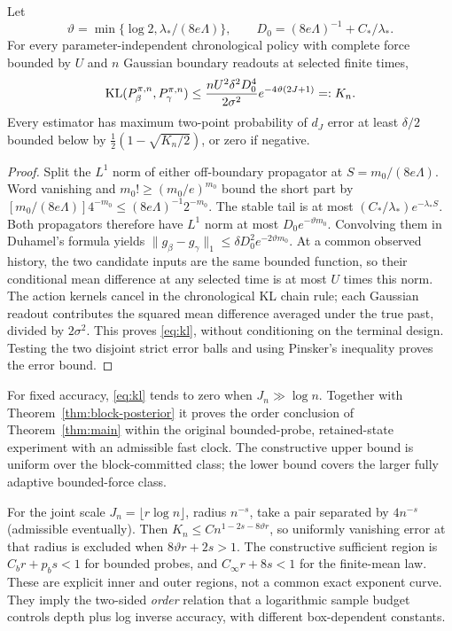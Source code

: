 \begin{theorem}
\label{thm:global}
Let
\[
 \vartheta=\min\{\log2,\lambda_* /(8e\Lambda)\},\qquad
 D_0=(8e\Lambda)^{-1}+C_*/\lambda_*.
\]
For every parameter-independent chronological policy with complete force
bounded by $U$ and $n$ Gaussian boundary readouts at selected finite times,
\begin{equation}
 \operatorname{KL}(P_\beta^{\pi,n},P_\gamma^{\pi,n})
 \le\frac{nU^2\delta^2D_0^4}{2\sigma^2}e^{-4\vartheta(2J+1)}=:K_n.
 \label{eq:kl}
\end{equation}
Every estimator has maximum two-point probability of $d_J$ error at least
$\delta/2$ bounded below by $\frac12(1-\sqrt{K_n/2})$, or zero if negative.
\end{theorem}
\begin{proof}
Split the $L^1$ norm of either off-boundary propagator at
$S=m_0/(8e\Lambda)$. Word vanishing and $m_0!\ge(m_0/e)^{m_0}$ bound the
short part by
$[m_0/(8e\Lambda)]4^{-m_0}\le(8e\Lambda)^{-1}2^{-m_0}$.
The stable tail is at most $(C_*/\lambda_*)e^{-\lambda_*S}$.
Both propagators therefore have $L^1$ norm at most $D_0e^{-\vartheta m_0}$.
Convolving them in Duhamel's formula yields
$\|g_\beta-g_\gamma\|_1\le\delta D_0^2e^{-2\vartheta m_0}$.
At a common observed history, the two candidate inputs are the same bounded
function, so their conditional mean difference at any selected time is at
most $U$ times this norm. The action kernels cancel in the chronological
KL chain rule; each Gaussian readout contributes the squared mean difference
averaged under the true past, divided by $2\sigma^2$.
This proves \eqref{eq:kl}, without conditioning on the terminal design.
Testing the two disjoint strict error balls and using Pinsker's inequality
proves the error bound.
\end{proof}

For fixed accuracy, \eqref{eq:kl} tends to zero when $J_n\gg\log n$.
Together with Theorem~\ref{thm:block-posterior} it proves the order conclusion
of Theorem~\ref{thm:main} within the original bounded-probe, retained-state
experiment with an admissible fast clock. The constructive upper bound is
uniform over the block-committed class; the lower bound covers the larger
fully adaptive bounded-force class.

For the joint scale $J_n=\lfloor r\log n\rfloor$, radius $n^{-s}$, take a
pair separated by $4n^{-s}$ (admissible eventually). Then
$K_n\le Cn^{1-2s-8\vartheta r}$, so uniformly vanishing error at that radius
is excluded when $8\vartheta r+2s>1$.
The constructive sufficient region is $C_b r+p_b s<1$ for bounded probes,
and $C_\infty r+8s<1$ for the finite-mean law. These are explicit inner and
outer regions, not a common exact exponent curve. They imply the two-sided
\emph{order} relation that a logarithmic sample budget controls depth plus
log inverse accuracy, with different box-dependent constants.

